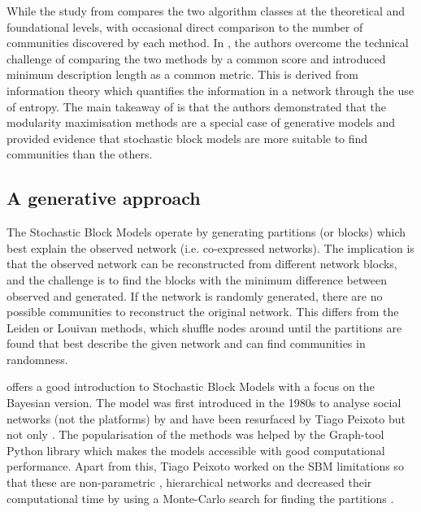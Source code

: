 While the study from \citet{Peixoto2023-se} compares the two algorithm classes at the theoretical and foundational levels, with occasional direct comparison to the number of communities discovered by each method. In \citet{Peixoto2023-rt}, the authors overcome the technical challenge of comparing the two methods by a common score and introduced minimum description length as a common metric. This is derived from information theory which quantifies the information in a network through the use of entropy. The main takeaway of \citet{Peixoto2023-rt} is that the authors demonstrated that the modularity maximisation methods are a special case of generative models and provided evidence that stochastic block models are more suitable to find communities than the others.

\subsection{A generative approach} \label{s:lit:sbm}


The Stochastic Block Models operate by generating partitions (or blocks) which best explain the observed network (i.e. co-expressed networks). The implication is that the observed network can be reconstructed from different network blocks, and the challenge is to find the blocks with the minimum difference between observed and generated. If the network is randomly generated, there are no possible communities to reconstruct the original network. This differs from the Leiden or Louivan methods, which shuffle nodes around until the partitions are found that best describe the given network and can find communities in randomness. 

\citet{Peixoto2019-fg} offers a good introduction to Stochastic Block Models with a focus on the Bayesian version. The model was first introduced in the 1980s to analyse social networks (not the platforms) by \citet{Holland1983-eu} and have been resurfaced by Tiago Peixoto \citep{Peixoto2014-ls, Peixoto2017-gc, Peixoto2018-ot} but not only \citep{Karrer2011-si}. The popularisation of the methods was helped by the Graph-tool Python library \citep{Peixoto2014-ls} which makes the models accessible with good computational performance. Apart from this, Tiago Peixoto worked on the SBM limitations so that these are non-parametric \citep{Peixoto2017-gc, Peixoto2018-ot}, hierarchical networks \citep{Peixoto2014-yb} and decreased their computational time by using a Monte-Carlo search for finding the partitions \citep{Peixoto2014-ss}.

